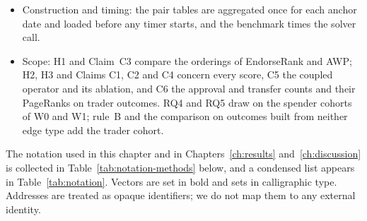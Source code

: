 \begin{itemize}
\begin{enumerate}
\item On 10~October~2026, after these results were known, the amounts were revised (Section~\ref{sec:amount-revision}). Every amount is valued in US dollars, only five tokens with reliable prices are kept, the value transform takes its slope from the median amount, and the cohort, the graphs, the proxies and the spender labels are rebuilt on those tokens. The revision was committed between 07:54 and 11:24~UTC, before any revised score was computed, and the revised analysis was then run with the protocols, rules and thresholds of the registered one. Chapter~\ref{ch:results} reports the revised analysis.
\end{enumerate}
In the registered analysis, only rule~A (its two contrasts in W0 and its same-window part) and the results registered for W1 (rule~B, the three further results, the two sensitivity analyses and the comparison on outcomes built from neither edge type) were fixed before the data they are judged on. In the revised analysis none was: the same rules and thresholds are applied, but to scores defined after the registered results were known. Every other contrast, the contrast of each PageRank with its own raw degree among them, was computed after the data it is judged on were known; it is reported as such, with its interval.
\item Construction and timing: the pair tables are aggregated once for each anchor date and loaded before any timer starts, and the benchmark times the solver call.
\item Scope: H1 and Claim~C3 compare the orderings of EndorseRank and AWP; H2, H3 and Claims C1, C2 and C4 concern every score, C5 the coupled operator and its ablation, and C6 the approval and transfer counts and their PageRanks on trader outcomes. RQ4 and RQ5 draw on the spender cohorts of W0 and W1; rule~B and the comparison on outcomes built from neither edge type add the trader cohort.
\end{itemize}


The notation used in this chapter and in Chapters~\ref{ch:results} and~\ref{ch:discussion} is collected in Table~\ref{tab:notation-methods} below, and a condensed list appears in Table~\ref{tab:notation}. Vectors are set in bold and sets in calligraphic type. Addresses are treated as opaque identifiers; we do not map them to any external identity.


